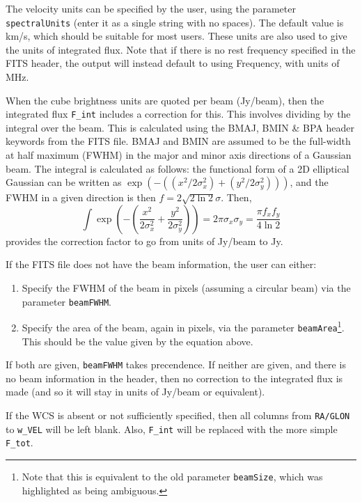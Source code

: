 The velocity units can be specified by the user, using the parameter
\texttt{spectralUnits} (enter it as a single string with no
spaces). The default value is km/s, which should be suitable for most
users. These units are also used to give the units of integrated
flux. Note that if there is no rest frequency specified in the FITS
header, the \duchamp output will instead default to using Frequency,
with units of MHz.

When the cube brightness units are quoted per beam (\eg Jy/beam), then
the integrated flux \texttt{F\_int} includes a correction for
this. This involves dividing by the integral over the beam. This is
calculated using the BMAJ, BMIN \& BPA header keywords from the FITS
file. BMAJ and BMIN are assumed to be the full-width at half maximum
(FWHM) in the major and minor axis directions of a Gaussian beam. The
integral is calculated as follows: the functional form of a 2D
elliptical Gaussian can be written as
$\exp(-((x^2/2\sigma_x^2)+(y^2/2\sigma_y^2)))$, and the FWHM in a
given direction is then $f=2\sqrt{2\ln2}\sigma$. Then, 
\[
\int
\exp\left(-\left(\frac{x^2}{2\sigma_x^2}+\frac{y^2}{2\sigma_y^2}\right)\right)
= 2\pi\sigma_x\sigma_y
=\frac{\pi f_x f_y}{4\ln2}
\]
provides the correction factor to go from units of Jy/beam to Jy. 

If the FITS file does not have the beam information, the user can
either:
\begin{enumerate}
\item Specify the FWHM of the beam in pixels (assuming a circular
  beam) via the parameter \texttt{beamFWHM}.
\item Specify the area of the beam, again in pixels, via the parameter
  \texttt{beamArea}\footnote{Note that this is equivalent to the old
    parameter \texttt{beamSize}, which was highlighted as being
    ambiguous.}. This should be the value given by the equation above.
\end{enumerate}
If both are given, \texttt{beamFWHM} takes precendence. If neither are
given, and there is no beam information in the header, then no
correction to the integrated flux is made (and so it will stay in
units of Jy/beam or equivalent).

If the WCS is absent or not sufficiently specified, then all columns
from \texttt{RA/GLON} to \texttt{w\_VEL} will be left blank. Also,
\texttt{F\_int} will be replaced with the more simple \texttt{F\_tot}.

